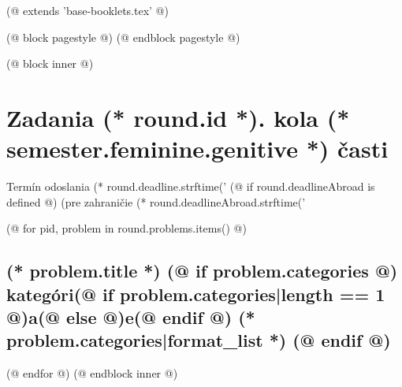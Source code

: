 (@ extends 'base-booklets.tex' @)
 
(@ block pagestyle @)
    \pagestyle{seminar-(* competition.id *)-(* volume.id *)-(* semester.id *)-(* round.id *)-problems}
(@ endblock pagestyle @)

(@ block inner @)
    \section{\texorpdfstring{Zadania (* round.id *). kola (* semester.feminine.genitive *) časti}{Zadania}}
    {
        \centering
        \vspace*{-5mm}
        Termín odoslania (* round.deadline.strftime('%
        (@ if round.deadlineAbroad is defined @) (pre zahraničie (* round.deadlineAbroad.strftime('%
    } 
        
    (@ for pid, problem in round.problems.items() @)%
        \setcounter{volume}{(* volume.number *)}%
        \setcounter{semester}{(* semester.number *)}%
        \setcounter{round}{(* round.number *)}%
        \setcounter{problem}{(* problem.number *)}%
        
        \subsection{%
            \texorpdfstring{%
                \large \textbf{(* problem.title *)}%
                (@ if problem.categories @)%
                \normalsize \hfill kategóri(@ if problem.categories|length == 1 @)a(@ else @)e(@ endif @) (* problem.categories|format_list *)%
                (@ endif @)
            }{%
                (* round.number *).(* problem.number *) (* problem.title *)%
            }%
        }%
    (@ endfor @)
(@ endblock inner @)
